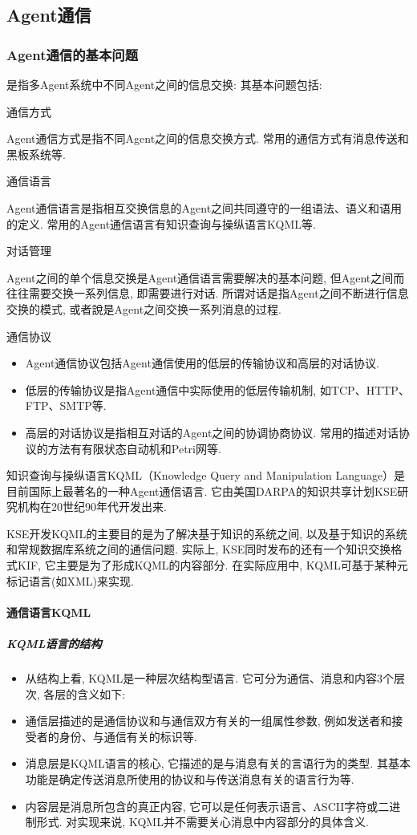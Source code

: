 \subsection{Agent通信}
\subsubsection{Agent通信的基本问题}

    是指多Agent系统中不同Agent之间的信息交换: 其基本问题包括:

通信方式

    Agent通信方式是指不同Agent之间的信息交换方式. 常用的通信方式有消息传送和黑板系统等.

通信语言

    Agent通信语言是指相互交换信息的Agent之间共同遵守的一组语法、语义和语用的定义. 常用的Agent通信语言有知识查询与操纵语言KQML等.

对话管理

    Agent之间的单个信息交换是Agent通信语言需要解决的基本问题, 但Agent之间而往往需要交换一系列信息, 即需要进行对话. 所谓对话是指Agent之间不断进行信息交换的模式, 或者說是Agent之间交换一系列消息的过程.

通信协议
\begin{itemize}
\item Agent通信协议包括Agent通信使用的低层的传输协议和高层的对话协议.
\item 低层的传输协议是指Agent通信中实际使用的低层传输机制, 如TCP、HTTP、FTP、SMTP等.
\item 高层的对话协议是指相互对话的Agent之间的协调协商协议. 常用的描述对话协议的方法有有限状态自动机和Petri网等.
\end{itemize}

知识查询与操纵语言KQML（Knowledge Query and Manipulation Language）是目前国际上最著名的一种Agent通信语言. 它由美国DARPA的知识共享计划KSE研究机构在20世纪90年代开发出来.

KSE开发KQML的主要目的是为了解决基于知识的系统之间, 以及基于知识的系统和常规数据库系统之间的通信问题. 实际上, KSE同时发布的还有一个知识交换格式KIF, 它主要是为了形成KQML的内容部分. 在实际应用中, KQML可基于某种元标记语言(如XML)来实现.
\paragraph{通信语言KQML}
\subparagraph{KQML语言的结构}

\begin{itemize}
\item 从结构上看, KQML是一种层次结构型语言. 它可分为通信、消息和内容3个层次, 各层的含义如下:
\item 通信层描述的是通信协议和与通信双方有关的一组属性参数, 例如发送者和接受者的身份、与通信有关的标识等.
\item 消息层是KQML语言的核心, 它描述的是与消息有关的言语行为的类型. 其基本功能是确定传送消息所使用的协议和与传送消息有关的语言行为等.
\item 内容层是消息所包含的真正内容, 它可以是任何表示语言、ASCII字符或二进制形式. 对实现来说, KQML并不需要关心消息中内容部分的具体含义.
\end{itemize}

